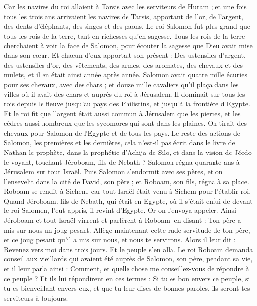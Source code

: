 \begin{multicols}{2}
Car les navires du roi allaient à Tarsis avec les serviteurs de Huram ; et une fois tous les trois ans arrivaient les navires de Tarsis, apportant de l'or, de l'argent, des dents d'éléphants, des singes et des paons.
Le roi Salomon fut plus grand que tous les rois de la terre, tant en richesses qu'en sagesse.
Tous les rois de la terre cherchaient à voir la face de Salomon, pour écouter la sagesse que Dieu avait mise dans son cœur.
Et chacun d'eux apportait son présent : Des ustensiles d'argent, des ustensiles d'or, des vêtements, des armes, des aromates, des chevaux et des mulets, et il en était ainsi année après année.
Salomon avait quatre mille écuries pour ses chevaux, avec des chars ; et douze mille cavaliers qu'il plaça dans les villes où il avait des chars et auprès du roi à Jérusalem.
Il dominait sur tous les rois depuis le fleuve jusqu'au pays des Philistins, et jusqu'à la frontière d'Egypte.
Et le roi fit que l'argent était aussi commun à Jérusalem que les pierres, et les cèdres aussi nombreux que les sycomores qui sont dans les plaines.
On tirait des chevaux pour Salomon de l'Egypte et de tous les pays.
Le reste des actions de Salomon, les premières et les dernières, cela n'est-il pas écrit dans le livre de Nathan le prophète, dans la prophétie d'Achija de Silo, et dans la vision de Jéedo le voyant, touchant Jéroboam, fils de Nebath ?
Salomon régna quarante ans à Jérusalem sur tout Israël.
Puis Salomon s'endormit avec ses pères, et on l'ensevelit dans la cité de David, son père ; et Roboam, son fils, régna à sa place.
\VerseOne{}Roboam se rendit à Sichem, car tout Israël était venu à Sichem pour l'établir roi.
Quand Jéroboam, fils de Nebath, qui était en Egypte, où il s'était enfui de devant le roi Salomon, l'eut appris, il revint d'Egypte.
Or on l'envoya appeler. Ainsi Jéroboam et tout Israël vinrent et parlèrent à Roboam, en disant :
Ton père a mis sur nous un joug pesant. Allège maintenant cette rude servitude de ton père, et ce joug pesant qu'il a mis sur nous, et nous te servirons.
Alors il leur dit : Revenez vers moi dans trois jours. Et le peuple s'en alla.
Le roi Roboam demanda conseil aux vieillards qui avaient été auprès de Salomon, son père, pendant sa vie, et il leur parla ainsi : Comment, et quelle chose me conseillez-vous de répondre à ce peuple ?
 Et ils lui répondirent en ces termes : Si tu es bon envers ce peuple, si tu es bienveillant envers eux, et que tu leur dises de bonnes paroles, ils seront tes serviteurs à toujours.

\end{multicols}
